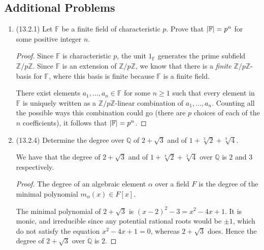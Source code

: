 \documentclass[11pt]{article}
\begin{document}
\subsection*{Additional Problems}
\begin{enumerate}
    \item (13.2.1) Let $\mathbb{F}$ be a finite field of characteristic $p$. Prove that $\abs{\mathbb{F}} = p^n$ for some positive integer $n$. \begin{proof}
        Since $\mathbb{F}$ is characteristic $p$, the unit $1_\mathbb{F}$ generates the prime subfield $\mathbb{Z}/p\mathbb{Z}$. Since $\mathbb{F}$ is an extension of $\mathbb{Z}/p\mathbb{Z}$, we know that there is a \textit{finite} $\mathbb{Z}/p\mathbb{Z}$-basis for $\mathbb{F}$, where this basis is finite because $\mathbb{F}$ is a finite field.

        There exist elements $a_1,\dots,a_n\in \mathbb{F}$ for some $n\geq 1$ such that every element in $\mathbb{F}$ is uniquely written as a $\mathbb{Z}/p\mathbb{Z}$-linear combination of $a_1,\dots,a_n$. Counting all the possible ways this combination could go (there are $p$ choices of each of the $n$ coefficients), it follows that $\abs{\mathbb{F}} = p^n$.
    \end{proof}
    \item (13.2.4) Determine the degree over $\mathbb{Q}$ of $2+\sqrt{3}$ and of $1 + \sqrt[3]{2} + \sqrt[3]{4}$. 
    
    We have that the degree of $2+\sqrt{3}$ and of $1 + \sqrt[3]{2} + \sqrt[3]{4}$ over $\mathbb{Q}$ is $2$ and $3$ respectively. \begin{proof}
        The degree of an algebraic element $\alpha$ over a field $F$ is the degree of the minimal polynomial $m_\alpha(x)\in F[x]$.
        
        The minimal polynomial of $2+\sqrt{3}$ is $(x-2)^2 - 3 = x^2-4x+1$. It is monic, and irreducible since any potential rational roots would be $\pm 1$, which do not satisfy the equation $x^2-4x+1 = 0$, whereas $2+\sqrt{3}$ does. Hence the degree of $2+\sqrt{3}$ over $\mathbb{Q}$ is $2$.


\end{proof}
\end{enumerate}
\end{document}
